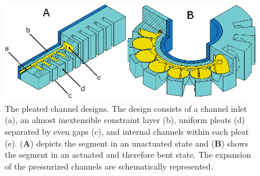 
\begin{figure}[thpb]
\centering
   \includegraphics[width=0.99\columnwidth]{figures/robotic_gripper/design_gripper_detailed.eps}
   \caption{The pleated channel designs. The design consists of a channel inlet (a), an almost inextensible constraint layer (b), uniform pleats (d) separated by even gaps (c), and internal channels within each pleat (e). (\textbf{A}) depicts the segment in an unactuated state and (\textbf{B}) shows the segment in an actuated and therefore bent state. The expansion of the pressurized channels are schematically represented. }
   \label{fig:design}
\end{figure}


